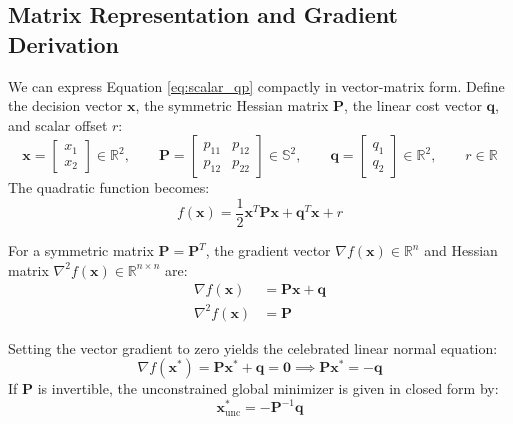 \documentclass[11pt,a4paper]{article}
\begin{document}
\subsection{Matrix Representation and Gradient Derivation}
We can express Equation \eqref{eq:scalar_qp} compactly in vector-matrix form. Define the decision vector $\mathbf{x}$, the symmetric Hessian matrix $\mathbf{P}$, the linear cost vector $\mathbf{q}$, and scalar offset $r$:
\begin{equation}
\mathbf{x} = \begin{bmatrix} x_1 \\ x_2 \end{bmatrix} \in \mathbb{R}^2, \qquad
\mathbf{P} = \begin{bmatrix} p_{11} & p_{12} \\ p_{12} & p_{22} \end{bmatrix} \in \mathbb{S}^2, \qquad
\mathbf{q} = \begin{bmatrix} q_1 \\ q_2 \end{bmatrix} \in \mathbb{R}^2, \qquad
r \in \mathbb{R}
\end{equation}
The quadratic function becomes:
\begin{equation}
f(\mathbf{x}) = \frac{1}{2} \mathbf{x}^T \mathbf{P} \mathbf{x} + \mathbf{q}^T \mathbf{x} + r
\label{eq:matrix_qp}
\end{equation}

\begin{definitionbox}
For a symmetric matrix $\mathbf{P} = \mathbf{P}^T$, the gradient vector $\nabla f(\mathbf{x}) \in \mathbb{R}^n$ and Hessian matrix $\nabla^2 f(\mathbf{x}) \in \mathbb{R}^{n \times n}$ are:
\begin{align}
\nabla f(\mathbf{x}) &= \mathbf{P} \mathbf{x} + \mathbf{q} \\
\nabla^2 f(\mathbf{x}) &= \mathbf{P}
\end{align}
\end{definitionbox}

Setting the vector gradient to zero yields the celebrated linear normal equation:
\begin{equation}
\nabla f(\mathbf{x}^*) = \mathbf{P} \mathbf{x}^* + \mathbf{q} = \mathbf{0} \implies \mathbf{P} \mathbf{x}^* = -\mathbf{q}
\label{eq:normal_equation}
\end{equation}
If $\mathbf{P}$ is invertible, the unconstrained global minimizer is given in closed form by:
\begin{equation}
\mathbf{x}^*_{\mathrm{unc}} = -\mathbf{P}^{-1} \mathbf{q}
\label{eq:unconstrained_sol}
\end{equation}
\end{document}
